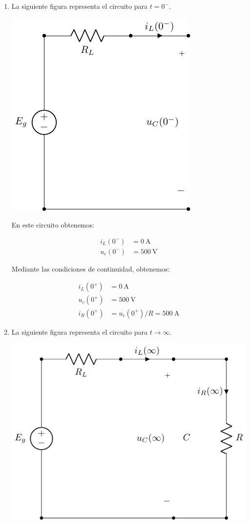 \documentclass[12pt]{article}
\begin{document}
\begin{enumerate}

\item

  La siguiente figura representa el circuito para $t = 0^-$.

  \includegraphics{figs/E2_t0.pdf}

  En este circuito obtenemos:

\begin{align*}
  i_L(0^-) &= \SI{0}{\ampere}\\
  u_c(0^-) &= \SI{500}{\volt}
\end{align*}

Mediante las condiciones de continuidad, obtenemos:

\begin{align*}
  i_L(0^+) &= \SI{0}{\ampere}\\
  u_c(0^+) &= \SI{500}{\volt}\\
  i_R(0^+) &= u_c(0^+)/R = \SI{500}{\ampere}
\end{align*}

\item


  La siguiente figura representa el circuito para $t \to \infty$.

  \includegraphics{figs/E2_permanente.pdf}


\end{enumerate}
\end{document}
